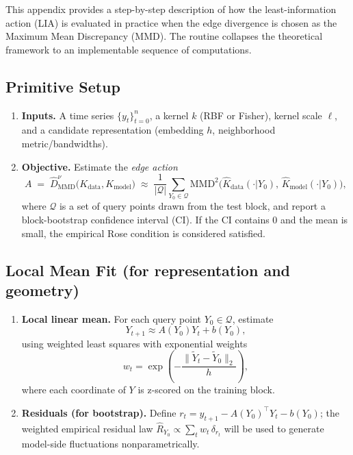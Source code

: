 \documentclass[11pt]{article}
\newcommand{\1}{\mathbf{1}}
\begin{document}
This appendix provides a step-by-step description of how the least-information action (LIA) is evaluated in practice when the edge divergence is chosen as the Maximum Mean Discrepancy (MMD). The routine collapses the theoretical framework to an implementable sequence of computations.

\subsection{Primitive Setup}
\begin{enumerate}
    \item \textbf{Inputs.} A time series $\{y_t\}_{t=0}^n$, a kernel $k$ (RBF or Fisher), kernel scale $\ell$, and a candidate representation (embedding $h$, neighborhood metric/bandwidths).
    \item \textbf{Objective.} Estimate the \emph{edge action}
    \[
        A \;=\; \widehat{D}_{\mathrm{MMD}}^\nu \big( K_{\mathrm{data}}, K_{\mathrm{model}} \big)
        \;\approx\; \frac{1}{|\mathcal Q|} \sum_{Y_0 \in \mathcal Q} 
        \mathrm{MMD}^2\!\big( \widehat K_{\mathrm{data}}(\cdot|Y_0),\,\widehat K_{\mathrm{model}}(\cdot|Y_0) \big),
    \]
    where $\mathcal Q$ is a set of query points drawn from the test block, and report a block-bootstrap confidence interval (CI). If the CI contains $0$ and the mean is small, the empirical Rose condition is considered satisfied.
\end{enumerate}

\subsection{Local Mean Fit (for representation and geometry)}
\begin{enumerate}
    \item \textbf{Local linear mean.} For each query point $Y_0 \in \mathcal Q$, estimate
    \[
        Y_{t+1} \approx A(Y_0) Y_t + b(Y_0),
    \]
    using weighted least squares with exponential weights
    \[
        w_t = \exp\!\left(-\frac{\| \widetilde Y_t - \widetilde Y_0\|_2}{h}\right),
    \]
    where each coordinate of $Y$ is z-scored on the training block.
    \item \textbf{Residuals (for bootstrap).} Define $r_t = y_{t+1} - A(Y_0)^\top Y_t - b(Y_0)$; the weighted empirical residual law
    \(
      \widehat R_{Y_0} \propto \sum_t w_t \,\delta_{r_t}
    \)
    will be used to generate model-side fluctuations nonparametrically.
\end{enumerate}
\end{document}
